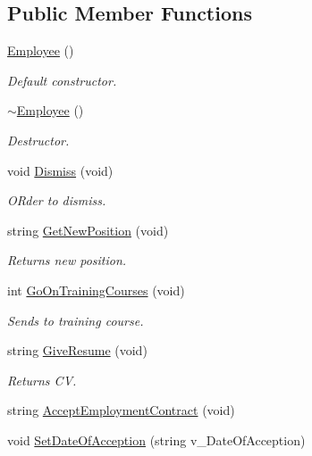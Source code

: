 \subsection*{Public Member Functions}
\begin{DoxyCompactItemize}
\item 
\hyperlink{class_employee_a003c7bd08c40924e381eb0750cbb906f}{Employee} ()
\begin{DoxyCompactList}\small\item\em Default constructor. \end{DoxyCompactList}\item 
\hyperlink{class_employee_abed56e9c007fff2bfe27ca87251baaf2}{$\sim$\+Employee} ()
\begin{DoxyCompactList}\small\item\em Destructor. \end{DoxyCompactList}\item 
void \hyperlink{class_employee_a0bec05aa09e9a7a12e3c3de49c43c158}{Dismiss} (void)
\begin{DoxyCompactList}\small\item\em O\+Rder to dismiss. \end{DoxyCompactList}\item 
string \hyperlink{class_employee_ae210ea3433b4596f9d3ff5dee4c63bc2}{Get\+New\+Position} (void)
\begin{DoxyCompactList}\small\item\em Returns new position. \end{DoxyCompactList}\item 
int \hyperlink{class_employee_a8644c276b8a3cdb8bb62a71a492e574d}{Go\+On\+Training\+Courses} (void)
\begin{DoxyCompactList}\small\item\em Sends to training course. \end{DoxyCompactList}\item 
string \hyperlink{class_employee_a37e77828f9f559a27951e3113b3fb520}{Give\+Resume} (void)
\begin{DoxyCompactList}\small\item\em Returns CV. \end{DoxyCompactList}\item 
string \hyperlink{class_employee_ad7a5d34564702bc8b880db1714c75413}{Accept\+Employment\+Contract} (void)
\item 
void \hyperlink{class_employee_a62cc0f19d969528e061ad178a1b109ac}{Set\+Date\+Of\+Acception} (string v\+\_\+\+Date\+Of\+Acception)
\item 

\end{DoxyCompactItemize}
